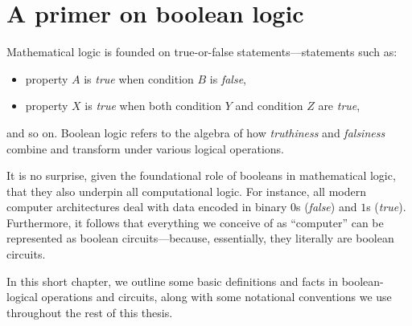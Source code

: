 \chapter{A primer on boolean logic}

Mathematical logic is founded on true-or-false statements---statements such as:
\begin{itemize}[nosep]
  \item property \(A\) is \emph{true} when condition \(B\) is \emph{false},
  \item property \(X\) is \emph{true} when both condition \(Y\) and condition
    \(Z\) are \emph{true},
\end{itemize}
and so on.  Boolean logic refers to the algebra of how \emph{truthiness} and
\emph{falsiness} combine and transform under various logical operations.

It is no surprise, given the foundational role of booleans in mathematical
logic, that they also underpin all computational logic. For instance, all
modern computer architectures deal with data encoded in binary \(0\)s
(\emph{false}) and \(1\)s (\emph{true}).  Furthermore, it follows that
everything we conceive of as ``computer'' can be represented as boolean
circuits---because, essentially, they literally are boolean circuits.


In this short chapter, we outline some basic definitions and facts in
boolean-logical operations and circuits, along with some notational conventions
we use throughout the rest of this thesis.

